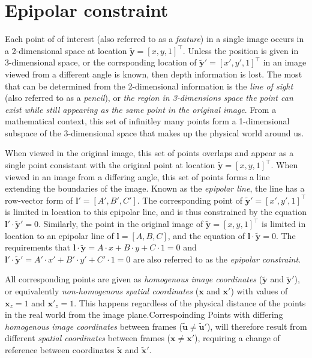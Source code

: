 \documentclass{report}
\begin{document}
\section{Epipolar constraint}
\par Each point of of interest (also referred to as a \textit{feature}) in a single image occurs in a 2-dimensional space at location $\mathbf{\tilde{y}}=[x,y,1]^\intercal$. Unless the position is given in 3-dimensional space, or the corrsponding location of $\mathbf{\tilde{y}'}=[x',y',1]^\intercal$ in an image viewed from a different angle is known, then depth information is lost. The most that can be determined from the 2-dimensional information is the \textit{line of sight} (also referred to as a \textit{pencil}), or \textit{the region in 3-dimensions space the point can exist while still appearing as the same point in the original image}. From a mathematical context, this set of infinitley many points form a 1-dimensional subspace of the 3-dimensional space that makes up the physical world around us.   
\par When viewed in the original image, this set of points overlaps and appear as a single point consistant with the original point at location $\mathbf{\tilde{y}}=[x,y,1]^\intercal$. When viewed in an image from a differing angle, this set of points forms a line extending the boundaries of the image. Known as the \textit{epipolar line}, the line has a row-vector form of $\mathbf{l'}=[A',B',C']$. The corresponding point of $\mathbf{\tilde{y}'}=[x',y',1]^\intercal$ is limited in location to this epipolar line, and is thus constrained by the equation $\mathbf{l'}\cdot\mathbf{\tilde{y}'}=0 $. Similarly, the point in the original image of $\mathbf{\tilde{y}}=[x,y,1]^\intercal$ is limited in location to an epipolar line of $\mathbf{l}=[A,B,C]$, and the equation of $\mathbf{l}\cdot\mathbf{\tilde{y}}=0 $. The requirements that $\mathbf{l}\cdot\mathbf{\tilde{y}}=A\cdot{x}+B\cdot{y}+C\cdot 1=0 $ and  $\mathbf{l'}\cdot\mathbf{\tilde{y}'}=A'\cdot{x'}+B'\cdot{y'}+C'\cdot 1=0 $ are also referred to as the \textit{epipolar constraint}. 
\par All corresponding points are given as \textit{homogenous image coordinates} ($\mathbf{\tilde{y}}$ and $\mathbf{\tilde{y}'}$), or equivalently \textit{non-homogenous spatial coordinates} ($\mathbf{x}$ and $\mathbf{x'}$) with values of $\mathbf{x}_z=1$ and $\mathbf{x}'_z=1$. This happens regardless of the physical distance of the points in the real world from the image plane.Correspoinding Points with differing \textit{homogenous image coordinates} between frames ($\mathbf{\tilde{u}}\neq\mathbf{\tilde{u}'}$), will therefore result from different \textit{spatial coordinates} between frames ($\mathbf{x}\neq\mathbf{x'}$), requiring a change of reference between coordinates $\mathbf{\tilde{x}}$ and $\mathbf{\tilde{x}'}$.
  
\end{document}
